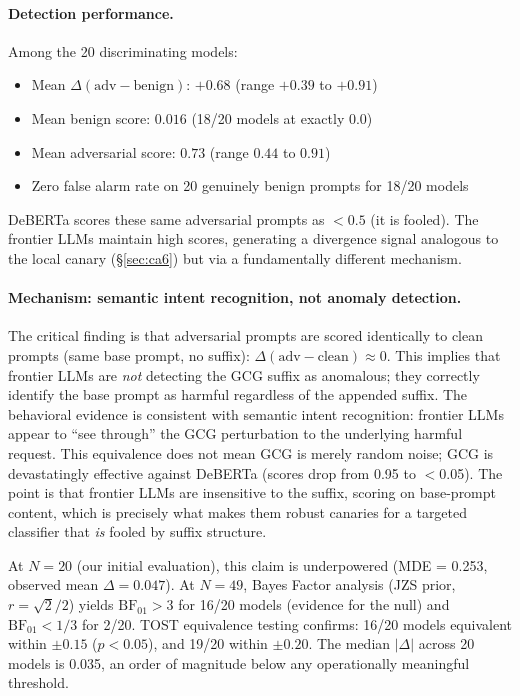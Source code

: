 \paragraph{Detection performance.} Among the 20 discriminating models:

\begin{itemize}
\item Mean $\Delta(\text{adv} - \text{benign})$: $+0.68$ (range $+0.39$ to $+0.91$)
\item Mean benign score: $0.016$ (18/20 models at exactly $0.0$)
\item Mean adversarial score: $0.73$ (range $0.44$ to $0.91$)
\item Zero false alarm rate on 20 genuinely benign prompts for 18/20 models
\end{itemize}

DeBERTa scores these same adversarial prompts as $< 0.5$ (it is fooled). The frontier LLMs maintain high scores, generating a divergence signal analogous to the local canary (\S\ref{sec:ca6}) but via a fundamentally different mechanism.

\paragraph{Mechanism: semantic intent recognition, not anomaly detection.}

The critical finding is that adversarial prompts are scored identically to clean prompts (same base prompt, no suffix): $\Delta(\text{adv} - \text{clean}) \approx 0$. This implies that frontier LLMs are \emph{not} detecting the GCG suffix as anomalous; they correctly identify the base prompt as harmful regardless of the appended suffix. The behavioral evidence is consistent with semantic intent recognition: frontier LLMs appear to ``see through'' the GCG perturbation to the underlying harmful request. This equivalence does not mean GCG is merely random noise; GCG is devastatingly effective against DeBERTa (scores drop from 0.95 to $<$0.05). The point is that frontier LLMs are insensitive to the suffix, scoring on base-prompt content, which is precisely what makes them robust canaries for a targeted classifier that \emph{is} fooled by suffix structure.

At $N = 20$ (our initial evaluation), this claim is underpowered (MDE = 0.253, observed mean $\Delta = 0.047$). At $N = 49$, Bayes Factor analysis (JZS prior, $r = \sqrt{2}/2$) yields $\text{BF}_{01} > 3$ for 16/20 models (evidence for the null) and $\text{BF}_{01} < 1/3$ for 2/20. TOST equivalence testing confirms: 16/20 models equivalent within $\pm 0.15$ ($p < 0.05$), and 19/20 within $\pm 0.20$. The median $|\Delta|$ across 20 models is 0.035, an order of magnitude below any operationally meaningful threshold.


